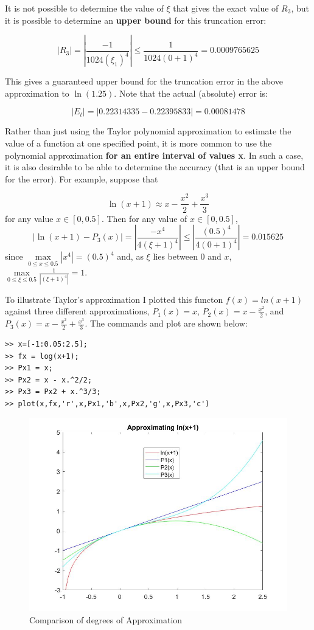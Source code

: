 \documentclass [titlepage,12pt,letter] {article}
\begin{document}
It is not possible to determine the value of $\xi$ that gives the exact 
value of $R_3$, but it is possible to determine an {\bf upper bound} for 
this truncation error: 

\[
|R_{3}| = \left| \frac{-1}{1024(\xi_1)^4}\right| \leq \frac{1}{1024(0+1)^4} = 0.0009765625
\]

This gives a guaranteed upper bound for the truncation error in the above approximation to $\ln(1.25)$. Note that the actual (absolute) error is: 

\[
|E_t| = |0.22314335 - 0.22395833| = 0.00081478
\]

Rather than just using the Taylor polynomial approximation to estimate the value of a function at one specified point, it is more common to use the polynomial approximation {\bf for an entire interval of values x}. In such a case, it is also desirable to be able to determine the accuracy (that is an upper bound for the error). For example, suppose that 

\[
\ln(x+1) \approx x - \frac{x^2}{2} + \frac{x^3}{3} 
\]
\noindent 
for any value $x \in [0, 0.5]$. Then for any value of $x \in [0, 0.5]$, 
\[
| \ln(x+1) - P_3(x)| = \left| \frac{-x^4}{4(\xi +1)^4} \right | \leq \left | \frac{(0.5)^4}{4(0+1)^4}\right| = 0.015625
\]
\noindent 
since $\max\limits_{0 \leq x \leq 0.5} |x^4| = (0.5)^4$ and, as $\xi$ lies between $0$ and $x$, $\max\limits_{0 \leq \xi \leq 0.5} \frac{1}{|(\xi + 1)^4|} = 1$. 

To illustrate Taylor's approximation I plotted this functon $f(x)=ln(x+1)$ against three different approximations, $P_1(x)=x$, $P_2(x) = x - \frac{x^2}{2}$, and $P_3(x)=x-\frac{x^2}{2}+\frac{x^3}{3}$. The commands and plot are shown below:

\begin{verbatim}
>> x=[-1:0.05:2.5];
>> fx = log(x+1);
>> Px1 = x;
>> Px2 = x - x.^2/2;
>> Px3 = Px2 + x.^3/3;
>> plot(x,fx,'r',x,Px1,'b',x,Px2,'g',x,Px3,'c')
\end{verbatim}

\begin{figure}[ht]
  \centering
  \includegraphics[scale=0.5]{lect5ex1}
  \caption{Comparison of degrees of Approximation}
  \label{fig:Lect5Ex1}
\end{figure}
\end{document}
